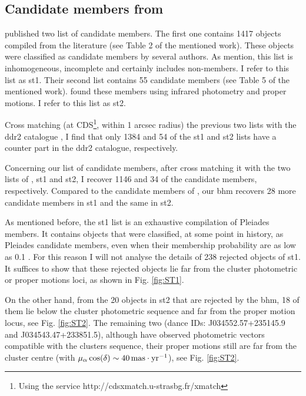 \subsection{Candidate members from \citet{Stauffer2007}}

\citet{Stauffer2007} published two list of candidate members. The first one contains 1417 objects compiled from the literature (see Table 2 of the mentioned work). These objects were classified as candidate members by several authors. As \citet{Stauffer2007} mention, this list is inhomogeneous, incomplete and certainly includes non-members. I refer to this list as \gls{st1}. Their second list contains 55 candidate members (see Table 5 of the mentioned work). \citet{Stauffer2007} found these members using infrared photometry and proper motions. I refer to this list as \gls{st2}.

Cross matching (at CDS\footnote{ Using the service http://cdsxmatch.u-strasbg.fr/xmatch}, within 1 arcsec radius) the previous two lists with the \gls{ddr2} catalogue \citep{Bouy2015}, I find that only 1384 and 54 of the \gls{st1} and \gls{st2} lists have a counter part in the \gls{ddr2} catalogue, respectively. 

Concerning our list of candidate members, after cross matching it with the two lists of \citet{Stauffer2007}, \gls{st1} and \gls{st2}, I recover 1146 and 34 of the candidate members, respectively. Compared to the candidate members of \citet{Bouy2015}, our \gls{bhm} recovers 28 more candidate members in \gls{st1} and the same in \gls{st2}.

As mentioned before, the \gls{st1} list is an exhaustive compilation of Pleiades members. It contains objects that were classified, at some point in history, as Pleiades candidate members, even when their membership probability are as low as 0.1 \citep{Stauffer2007}. For this reason I will not analyse the details of 238 rejected objects of \gls{st1}. It suffices to show that these rejected objects lie far from the cluster photometric or proper motions loci, as shown in Fig. \ref{fig:ST1}.

On the other hand, from the 20 objects in \gls{st2} that are rejected by the \gls{bhm}, 18 of them lie below the cluster photometric sequence and far from the proper motion locus, see Fig. \ref{fig:ST2}. The remaining two (\gls{dance} IDs: J034552.57+235145.9 and J034543.47+233851.5), although have observed photometric vectors compatible with the clusters sequence, their proper motions still are far from the cluster centre (with $\mu_{\alpha}\cos(\delta)\sim 40\,\rm{mas\cdot yr^{-1}}$), see Fig. \ref{fig:ST2}.

